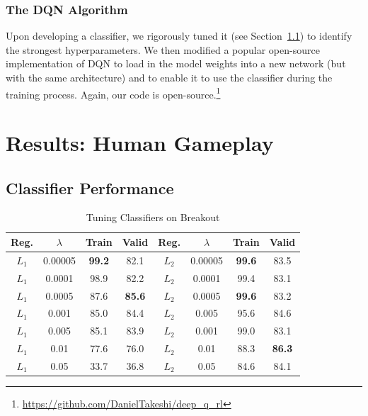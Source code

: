 \documentclass[letterpaper, 10pt, conference]{ieeeconf}
\begin{document}
\subsubsection{The DQN Algorithm} Upon developing a classifier, we rigorously
tuned it (see Section~\ref{ssec:results_classifier}) to identify the strongest
hyperparameters. We then modified a popular open-source implementation of DQN to
load in the model weights into a new network (but with the same architecture)
and to enable it to use the classifier during the training process. Again, our
code is open-source.\footnote{\url{https://github.com/DanielTakeshi/deep_q_rl}}



\section{Results: Human Gameplay}\label{sec:results_p1}

\subsection{Classifier Performance}\label{ssec:results_classifier}

\begin{table}[!t]
\renewcommand{\arraystretch}{1.3}
\caption{Tuning Classifiers on Breakout}
\label{tab:breakout}
\centering
\begin{tabular}{c c c c | c c c c}
\hline
Reg.  & $\lambda$ & Train & Valid & Reg.  & $\lambda$ & Train & Valid \\
\hline
$L_1$ & 0.00005   & \textbf{99.2}  & 82.1  & $L_2$ & 0.00005   & \textbf{99.6}  & 83.5 \\
$L_1$ & 0.0001    & 98.9  & 82.2  & $L_2$ & 0.0001    & 99.4  & 83.1 \\
$L_1$ & 0.0005    & 87.6  & \textbf{85.6}  & $L_2$ & 0.0005    & \textbf{99.6}  & 83.2 \\
$L_1$ & 0.001     & 85.0  & 84.4  & $L_2$ & 0.005     & 95.6  & 84.6 \\
$L_1$ & 0.005     & 85.1  & 83.9  & $L_2$ & 0.001     & 99.0  & 83.1 \\
$L_1$ & 0.01      & 77.6  & 76.0  & $L_2$ & 0.01      & 88.3  & \textbf{86.3} \\
$L_1$ & 0.05      & 33.7  & 36.8  & $L_2$ & 0.05      & 84.6  & 84.1 \\
\hline
\end{tabular}
\end{table}
\end{document}
